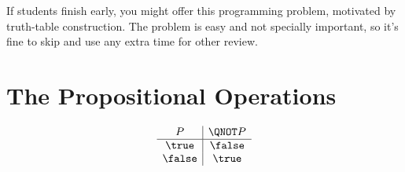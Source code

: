 \documentclass[handout]{mcs}
\begin{document}


\insolutions{\newpage}







\begin{staffnotes}
If students finish early, you might offer this programming problem,
motivated by truth-table construction.  The problem is easy and not
specially important, so it's fine to skip and use any extra time for
other review.
\end{staffnotes}

\iffalse

\begin{center}
\textbf{Supplmental Problem}\footnote{There is no need to study supplemental
  problems when preparing for quizzes or exams.}
\end{center}
\fi



\iffalse

\instatements{\newpage}
\section*{The Propositional Operations}

\[
\begin{array}{c|c}
P & \QNOT P \\ \hline
\true & \false \\
\false & \true \\
\end{array}
\]
\end{document}
